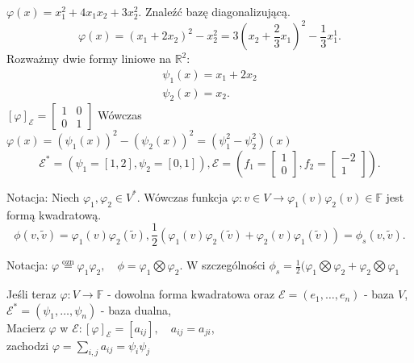 \documentclass[../main.tex]{subfiles}
\begin{document}
    \begin{przyklad}
        $\varphi(x) = x_1^2 + 4x_1x_2 + 3x_2^2$. Znaleźć bazę diagonalizującą.
        \[
            \varphi(x) = (x_1+2x_2)^2 - x_2^2 = 3(x_2+\frac{2}{3}x_1)^2 - \frac{1}{3}x_1^1
        .\]
        Rozważmy dwie formy liniowe na $\mathbb{R}^2$:\\
        \begin{align*}
            \psi_1(x) = x_1+2x_2\\
            \psi_2(x) = x_2
        .\end{align*}
        $\left[ \varphi \right] _\mathcal{E} = \begin{bmatrix} 1&0\\0&1 \end{bmatrix} $
        Wówczas $\varphi(x) = (\psi_1(x))^2 - (\psi_2(x))^2 = (\psi_1^2 - \psi_2^2)(x)$
        \[
            \mathcal{E}^* = \left( \psi_1 = \left[ 1,2 \right] , \psi_2 = \left[ 0,1 \right]  \right) , \mathcal{E} = \left( f_1 = \begin{bmatrix} 1\\0 \end{bmatrix} , f_2 = \begin{bmatrix} -2\\1 \end{bmatrix}  \right)
        .\]
    \end{przyklad}

    Notacja: Niech $\varphi_1, \varphi_2\in V^*$. Wówczas funkcja $\varphi: v\in V \to \varphi_1(v)\varphi_2(v)\in\mathbb{F}$ jest formą kwadratową.
    \[
        \phi(v,\tilde v) = \varphi_1(v)\varphi_2(\tilde v), \frac{1}{2} (\varphi_1(v)\varphi_2(\tilde v) + \varphi_2(v)\varphi_1(\tilde v)) = \phi_s(v,\tilde v)
    .\]

    Notacja: $\varphi\overset{\text{ozn}}{=}\varphi_1\varphi_2,\quad \phi = \varphi_1\bigotimes\varphi_2$. W szczególności $\phi_s = \frac{1}{2}(\varphi_1\bigotimes\varphi_2 + \varphi_2\bigotimes\varphi_1$

    Jeśli teraz $\varphi:V\to\mathbb{F}$ - dowolna forma kwadratowa oraz $\mathcal{E} = \left( e_1,\ldots,e_n \right) $ - baza $V$, $\mathcal{E}^* = \left( \psi_1,\ldots,\psi_n \right) $ - baza dualna,\\
    Macierz $\varphi$ w $\mathcal{E}: \left[ \varphi \right] _\mathcal{E} = \left[ a_{ij} \right] ,\quad a_{ij} = a_{ji}$,\\
    zachodzi $\varphi = \sum_{i,j} a_{ij} = \psi_i \psi_j$
\end{document}
